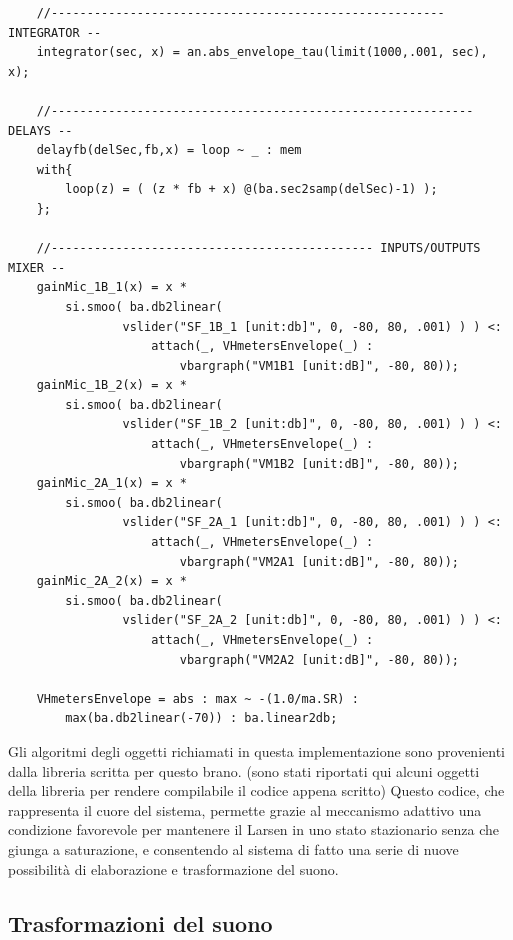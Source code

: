\begin{lstlisting}
    //------------------------------------------------------- INTEGRATOR --
    integrator(sec, x) = an.abs_envelope_tau(limit(1000,.001, sec), x);
    
    //----------------------------------------------------------- DELAYS --
    delayfb(delSec,fb,x) = loop ~ _ : mem
    with{ 
        loop(z) = ( (z * fb + x) @(ba.sec2samp(delSec)-1) );
    };
    
    //--------------------------------------------- INPUTS/OUTPUTS MIXER --
    gainMic_1B_1(x) = x *    
        si.smoo( ba.db2linear(
                vslider("SF_1B_1 [unit:db]", 0, -80, 80, .001) ) ) <:
                    attach(_, VHmetersEnvelope(_) :
                        vbargraph("VM1B1 [unit:dB]", -80, 80));
    gainMic_1B_2(x) = x * 
        si.smoo( ba.db2linear(
                vslider("SF_1B_2 [unit:db]", 0, -80, 80, .001) ) ) <:
                    attach(_, VHmetersEnvelope(_) :
                        vbargraph("VM1B2 [unit:dB]", -80, 80));
    gainMic_2A_1(x) = x * 
        si.smoo( ba.db2linear(
                vslider("SF_2A_1 [unit:db]", 0, -80, 80, .001) ) ) <:
                    attach(_, VHmetersEnvelope(_) :
                        vbargraph("VM2A1 [unit:dB]", -80, 80));
    gainMic_2A_2(x) = x * 
        si.smoo( ba.db2linear(
                vslider("SF_2A_2 [unit:db]", 0, -80, 80, .001) ) ) <:
                    attach(_, VHmetersEnvelope(_) :
                        vbargraph("VM2A2 [unit:dB]", -80, 80));
    
    VHmetersEnvelope = abs : max ~ -(1.0/ma.SR) : 
        max(ba.db2linear(-70)) : ba.linear2db;
\end{lstlisting}

Gli algoritmi degli oggetti richiamati in questa implementazione sono 
provenienti dalla libreria scritta per questo brano.
(sono stati riportati qui alcuni oggetti della libreria per rendere compilabile
il codice appena scritto)
Questo codice, che rappresenta il cuore del sistema,
permette grazie al meccanismo adattivo una condizione favorevole
per mantenere il Larsen in uno stato stazionario senza che giunga a 
saturazione, e consentendo al sistema
di fatto una serie di nuove possibilità di elaborazione e trasformazione del suono.

\clearpage
\subsection{Trasformazioni del suono}
\label{sec:Trasformazioni del suono}


